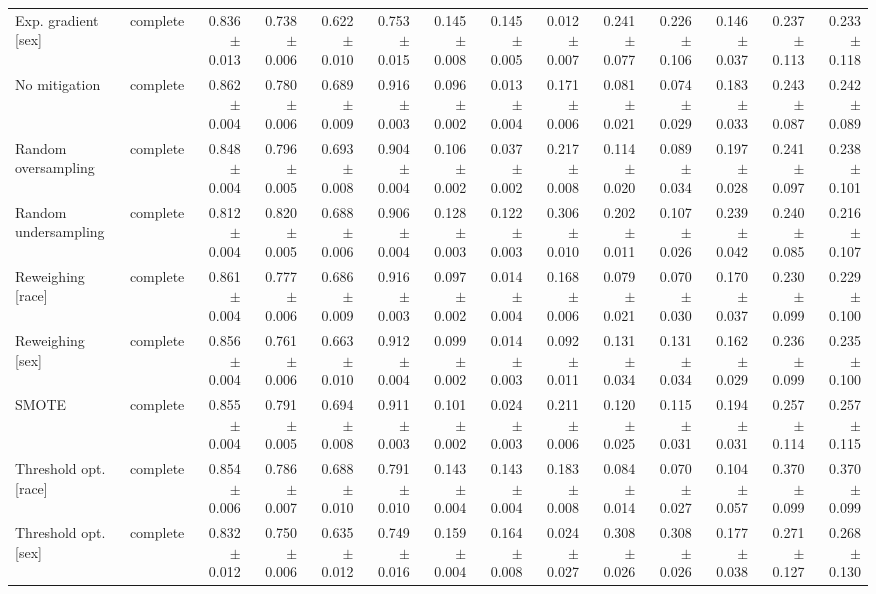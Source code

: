 \begin{table}[t]
{\begin{tabular}{llrrrrrrrrrrrr}
Exp. gradient {[}sex{]} & complete & 0.836 $\pm$ 0.013 & 0.738 $\pm$ 0.006 & 0.622 $\pm$ 0.010 & 0.753 $\pm$ 0.015 & 0.145 $\pm$ 0.008 & 0.145 $\pm$ 0.005 & 0.012 $\pm$ 0.007 & 0.241 $\pm$ 0.077 & 0.226 $\pm$ 0.106 & 0.146 $\pm$ 0.037 & 0.237 $\pm$ 0.113 & 0.233 $\pm$ 0.118 \\
No mitigation & complete & 0.862 $\pm$ 0.004 & 0.780 $\pm$ 0.006 & 0.689 $\pm$ 0.009 & 0.916 $\pm$ 0.003 & 0.096 $\pm$ 0.002 & 0.013 $\pm$ 0.004 & 0.171 $\pm$ 0.006 & 0.081 $\pm$ 0.021 & 0.074 $\pm$ 0.029 & 0.183 $\pm$ 0.033 & 0.243 $\pm$ 0.087 & 0.242 $\pm$ 0.089 \\
Random oversampling & complete & 0.848 $\pm$ 0.004 & 0.796 $\pm$ 0.005 & 0.693 $\pm$ 0.008 & 0.904 $\pm$ 0.004 & 0.106 $\pm$ 0.002 & 0.037 $\pm$ 0.002 & 0.217 $\pm$ 0.008 & 0.114 $\pm$ 0.020 & 0.089 $\pm$ 0.034 & 0.197 $\pm$ 0.028 & 0.241 $\pm$ 0.097 & 0.238 $\pm$ 0.101 \\
Random undersampling & complete & 0.812 $\pm$ 0.004 & 0.820 $\pm$ 0.005 & 0.688 $\pm$ 0.006 & 0.906 $\pm$ 0.004 & 0.128 $\pm$ 0.003 & 0.122 $\pm$ 0.003 & 0.306 $\pm$ 0.010 & 0.202 $\pm$ 0.011 & 0.107 $\pm$ 0.026 & 0.239 $\pm$ 0.042 & 0.240 $\pm$ 0.085 & 0.216 $\pm$ 0.107 \\
Reweighing {[}race{]} & complete & 0.861 $\pm$ 0.004 & 0.777 $\pm$ 0.006 & 0.686 $\pm$ 0.009 & 0.916 $\pm$ 0.003 & 0.097 $\pm$ 0.002 & 0.014 $\pm$ 0.004 & 0.168 $\pm$ 0.006 & 0.079 $\pm$ 0.021 & 0.070 $\pm$ 0.030 & 0.170 $\pm$ 0.037 & 0.230 $\pm$ 0.099 & 0.229 $\pm$ 0.100 \\
Reweighing {[}sex{]} & complete & 0.856 $\pm$ 0.004 & 0.761 $\pm$ 0.006 & 0.663 $\pm$ 0.010 & 0.912 $\pm$ 0.004 & 0.099 $\pm$ 0.002 & 0.014 $\pm$ 0.003 & 0.092 $\pm$ 0.011 & 0.131 $\pm$ 0.034 & 0.131 $\pm$ 0.034 & 0.162 $\pm$ 0.029 & 0.236 $\pm$ 0.099 & 0.235 $\pm$ 0.100 \\
SMOTE & complete & 0.855 $\pm$ 0.004 & 0.791 $\pm$ 0.005 & 0.694 $\pm$ 0.008 & 0.911 $\pm$ 0.003 & 0.101 $\pm$ 0.002 & 0.024 $\pm$ 0.003 & 0.211 $\pm$ 0.006 & 0.120 $\pm$ 0.025 & 0.115 $\pm$ 0.031 & 0.194 $\pm$ 0.031 & 0.257 $\pm$ 0.114 & 0.257 $\pm$ 0.115 \\
Threshold opt. {[}race{]} & complete & 0.854 $\pm$ 0.006 & 0.786 $\pm$ 0.007 & 0.688 $\pm$ 0.010 & 0.791 $\pm$ 0.010 & 0.143 $\pm$ 0.004 & 0.143 $\pm$ 0.004 & 0.183 $\pm$ 0.008 & 0.084 $\pm$ 0.014 & 0.070 $\pm$ 0.027 & 0.104 $\pm$ 0.057 & 0.370 $\pm$ 0.099 & 0.370 $\pm$ 0.099 \\
Threshold opt. {[}sex{]} & complete & 0.832 $\pm$ 0.012 & 0.750 $\pm$ 0.006 & 0.635 $\pm$ 0.012 & 0.749 $\pm$ 0.016 & 0.159 $\pm$ 0.004 & 0.164 $\pm$ 0.008 & 0.024 $\pm$ 0.027 & 0.308 $\pm$ 0.026 & 0.308 $\pm$ 0.026 & 0.177 $\pm$ 0.038 & 0.271 $\pm$ 0.127 & 0.268 $\pm$ 0.130 \\

\end{tabular}}
\end{table}
